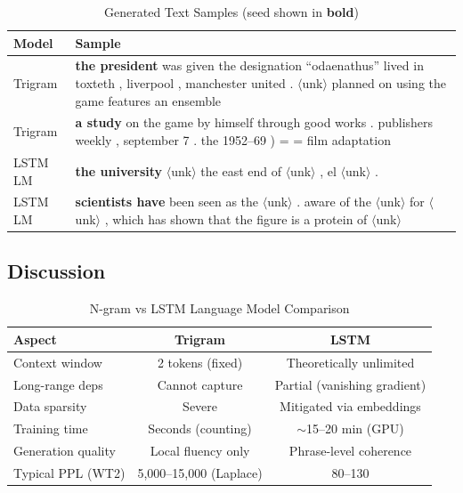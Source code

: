\begin{table}[H]
  \centering
  \small
  \caption{Generated Text Samples (seed shown in \textbf{bold})}
  \label{tab:q5_samples}
  \begin{tabularx}{\textwidth}{lX}
    \toprule
    \textbf{Model} & \textbf{Sample} \\
    \midrule
    Trigram  & \textbf{the president} was given the designation ``odaenathus'' lived in toxteth , liverpool , manchester united . $\langle$unk$\rangle$ planned on using the game features an ensemble \\[3pt]
    Trigram  & \textbf{a study} on the game by himself through good works . publishers weekly , september 7 . the 1952--69 ) = = film adaptation \\[3pt]
    LSTM LM  & \textbf{the university} $\langle$unk$\rangle$ the east end of $\langle$unk$\rangle$ , el $\langle$unk$\rangle$ . \\[3pt]
    LSTM LM  & \textbf{scientists have} been seen as the $\langle$unk$\rangle$ . aware of the $\langle$unk$\rangle$ for $\langle$unk$\rangle$ , which has shown that the figure is a protein of $\langle$unk$\rangle$ \\
    \bottomrule
  \end{tabularx}
\end{table}

\subsection{Discussion}

\begin{table}[H]
  \centering
  \caption{N-gram vs LSTM Language Model Comparison}
  \label{tab:q5_discussion}
  \begin{tabular}{lcc}
    \toprule
    \textbf{Aspect} & \textbf{Trigram} & \textbf{LSTM} \\
    \midrule
    Context window       & 2 tokens (fixed)     & Theoretically unlimited \\
    Long-range deps      & Cannot capture       & Partial (vanishing gradient) \\
    Data sparsity        & Severe               & Mitigated via embeddings \\
    Training time        & Seconds (counting)   & $\sim$15--20 min (GPU) \\
    Generation quality   & Local fluency only   & Phrase-level coherence \\
    Typical PPL (WT2)    & 5{,}000--15{,}000 (Laplace) & 80--130 \\
    \bottomrule
  \end{tabular}
\end{table}

